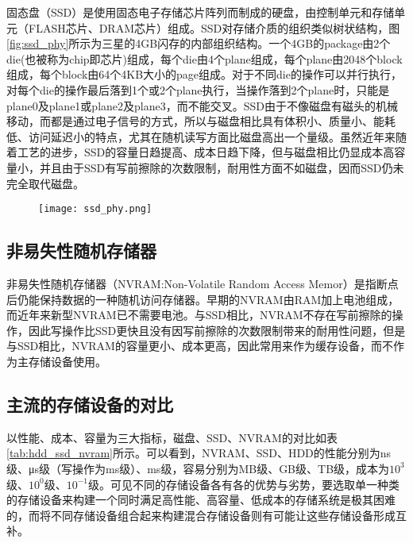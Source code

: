 固态盘（SSD）是使用固态电子存储芯片阵列而制成的硬盘，由控制单元和存储单元（FLASH芯片、DRAM芯片）组成。SSD对存储介质的组织类似树状结构，图\ref{fig:ssd_phy}所示为三星的4GB闪存的内部组织结构\cite{agrawal2008design}。一个4GB的package由2个die(也被称为chip即芯片)组成，每个die由4个plane组成，每个plane由2048个block组成，每个block由64个4KB大小的page组成。对于不同die的操作可以并行执行，对每个die的操作最后落到1个或2个plane执行，当操作落到2个plane时，只能是plane0及plane1或plane2及plane3，而不能交叉。SSD由于不像磁盘有磁头的机械移动，而都是通过电子信号的方式，所以与磁盘相比具有体积小、质量小、能耗低、访问延迟小的特点\cite{agrawal2008design, dirik2009performance}，尤其在随机读写方面比磁盘高出一个量级。虽然近年来随着工艺的进步，SSD的容量日趋提高、成本日趋下降，但与磁盘相比仍显成本高容量小，并且由于SSD有写前擦除的次数限制，耐用性方面不如磁盘，因而SSD仍未完全取代磁盘。

\begin{figure}[!htp]
  \centering
  \texttt{[image: ssd\_phy.png]}
  \hspace{1cm}
\end{figure}

\subsection{非易失性随机存储器}

非易失性随机存储器（NVRAM:Non-Volatile Random Access Memor）是指断点后仍能保持数据的一种随机访问存储器。早期的NVRAM由RAM加上电池组成，而近年来新型NVRAM已不需要电池。与SSD相比，NVRAM不存在写前擦除的操作，因此写操作比SSD更快且没有因写前擦除的次数限制带来的耐用性问题，但是与SSD相比，NVRAM的容量更小、成本更高，因此常用来作为缓存设备，而不作为主存储设备使用。

\subsection{主流的存储设备的对比}

以性能、成本、容量为三大指标，磁盘、SSD、NVRAM的对比如表\ref{tab:hdd_ssd_nvram}所示。可以看到，NVRAM、SSD、HDD的性能分别为ns级、μs级（写操作为ms级）、ms级，容易分别为MB级、GB级、TB级，成本为$10^{3}$级、$10^{0}$级、$10^{-1}$级。可见不同的存储设备各有各的优势与劣势，要选取单一种类的存储设备来构建一个同时满足高性能、高容量、低成本的存储系统是极其困难的，而将不同存储设备组合起来构建混合存储设备则有可能让这些存储设备形成互补。

